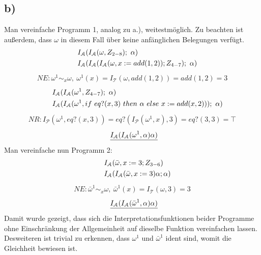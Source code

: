 \documentclass[12pt,runningheads,a4paper]{llncs}
\begin{document}
\subsection*{b)}
Man vereinfache Programm 1, analog zu a.), weitestmöglich. Zu beachten ist außerdem, dass $\omega$ in diesem Fall 
über keine anfänglichen Belegungen verfügt.
\begin{align}
&\indent I_\mathcal{A}(I_\mathcal{A}(\omega, Z_{2-8});\ \alpha) \\
&\indent I_\mathcal{A}(I_\mathcal{A}(I_\mathcal{A}(\omega, x := add(1,2)); Z_{4-7});\ \alpha)
\end{align}
\begin{gather*}
NE: \omega^1 \sim_x \omega,\: \omega^1(x) = I_\mathcal{T}(\omega, add(1,2)) = add(1,2) = 3
\end{gather*}
\begin{align}
&\indent I_\mathcal{A}(I_\mathcal{A}(\omega^1, Z_{4-7});\ \alpha)\\
&\indent I_\mathcal{A}(I_\mathcal{A}(\omega^1, if\ eq?(x,3)\ then\ \alpha\ else\ x := add(x,2)) );\ \alpha)
\end{align}
\begin{gather*}
NR: I_\mathcal{P}(\omega^1, eq?(x,3)) = eq?(I_\mathcal{P}(\omega^1,x),3) = eq?(3,3) = \top
\end{gather*}
\begin{align}
&\indent \underline{I_\mathcal{A}(I_\mathcal{A}(\omega^1, \alpha) \alpha)}
\end{align}
Man vereinfache nun Programm 2:
\begin{align}
&\indent I_\mathcal{A}(\bar{\omega}, x := 3; Z_{3-6})\\
&\indent I_\mathcal{A}(I_\mathcal{A}(\bar{\omega}, x := 3) \alpha; \alpha)\\
\end{align}
\begin{gather*}
NE: \bar{\omega}^1 \sim_x \omega,\: \bar{\omega}^1(x) = I_\mathcal{T}(\omega, 3) = 3
\end{gather*}
\begin{align}
&\indent \underline{I_\mathcal{A}(I_\mathcal{A}(\bar{\omega}^1, \alpha) \alpha)}
\end{align}
Damit wurde gezeigt, dass sich die Interpretationsfunktionen beider Programme ohne Einschränkung der Allgemeinheit 
auf dieselbe Funktion vereinfachen lassen. Desweiteren ist trivial zu erkennen, dass $\omega^1$ und $\bar{\omega}^1$ ident sind, 
womit die Gleichheit bewiesen ist.
\end{document}

